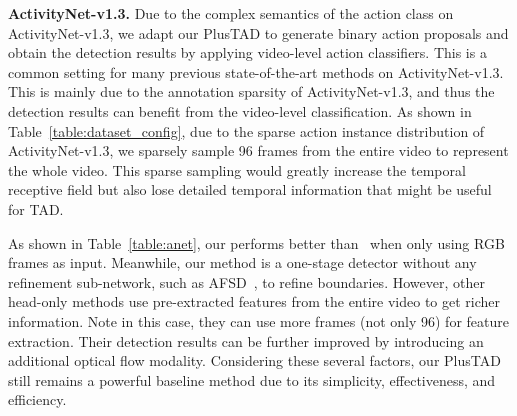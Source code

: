 \documentclass[a4paper,fleqn]{cas-dc}
\begin{document}
\textbf{ActivityNet-v1.3.}
Due to the complex semantics of the action class on ActivityNet-v1.3, we adapt our PlusTAD to generate binary action proposals and obtain the detection results by applying video-level action classifiers. This is a common setting for many previous state-of-the-art methods on ActivityNet-v1.3.
This is mainly due to the annotation sparsity of ActivityNet-v1.3, and thus the detection results can benefit from the video-level classification.
As shown in Table~\ref{table:dataset_config}, due to the sparse action instance distribution of ActivityNet-v1.3, we sparsely sample 96 frames from the entire video to represent the whole video. This sparse sampling would greatly increase the temporal receptive field but also lose detailed temporal information that might be useful for TAD.


As shown in Table~\ref{table:anet}, our  performs better than~\citep{bmn,g-tad,afsd} when only using RGB frames as input.
Meanwhile, our method is a one-stage detector without any refinement sub-network, such as AFSD~\citep{afsd}, to refine boundaries. 
However, other head-only methods use pre-extracted features from the entire video to get richer information. Note in this case, they can use more frames (not only 96) for feature extraction.
Their detection results can be further improved by introducing an additional optical flow modality.
Considering these several factors, our PlusTAD still remains a powerful baseline method due to its simplicity, effectiveness, and efficiency.
\end{document}

